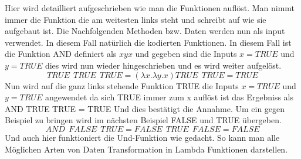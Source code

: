 Hier wird detailliert aufgeschrieben wie man die Funktionen auflöst. Man nimmt immer die Funktion die am weitesten links steht und schreibt auf wie sie aufgebaut ist. Die Nachfolgenden Methoden bzw. Daten werden nun als input verwendet. In diesem Fall natürlich die kodierten Funktionen. In diesem Fall ist die Funktion AND definiert als $x y x$
und gegeben sind die Inputs $x = TRUE$ und $y = TRUE$ dies wird nun wieder hingeschrieben und es wird weiter aufgelöst. 
\begin{equation}
TRUE\:\:TRUE\:\:TRUE = (\lambda x. \lambda y. x) TRUE\:\:TRUE = TRUE
\end{equation}
Nun wird auf die ganz links stehende Funktion TRUE die Inputs $x = TRUE$ und $y = TRUE$ angewendet da sich TRUE immer zum x auflöst ist das Ergebniss als AND TRUE TRUE = TRUE
Und dies bestätigt die Annahme. Um ein gegen Beispiel zu bringen wird im nächsten Beispiel FALSE und TRUE übergeben.
\begin{equation}
AND\:\:FALSE\:\:TRUE = FALSE\:\:TRUE\:\:FALSE = FALSE
\end{equation}
Und auch hier funktioniert die Und-Funktion wie gedacht. So kann man alle Möglichen Arten von Daten Transformation in Lambda Funktionen darstellen. 
\cite{lambdacalculus}

